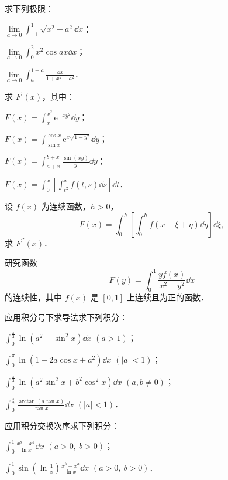 \begin{xiti}
\item 求下列极限：
\begin{ziti}
\item $\lim\limits_{a\to 0}\displaystyle\int_{-1}^{1}\sqrt{x^{2}+a^{2}}\dd x$；
\item $\lim\limits_{a\to 0}\displaystyle\int_{0}^{2}x^{2}\cos ax\dd x$；
\item $\lim\limits_{a\to 0}\displaystyle\int_{a}^{1+a}\frac{\dd x}{1+x^{2}+a^{2}}$．
\end{ziti}
\item 求 $F^{\prime}(x)$，其中：
\begin{ziti}
\item $F(x)=\displaystyle\int_{x}^{x^{2}}\mathrm{e}^{-xy^{2}}\dd y$；
\item $F(x)=\displaystyle\int_{\sin x}^{\cos x}\mathrm{e}^{x\sqrt{1-y^{2}}}\dd y$；
\item $F(x)=\displaystyle\int_{a+x}^{b+x}\frac{\sin(xy)}{y}\dd y$；
\item $F(x)=\displaystyle\int_{0}^{x}\left[\int_{t^{2}}^{x}f(t,s)\dd s\right]\dd t$．
\end{ziti}
\item 设 $f(x)$ 为连续函数，$h>0$，
\[
F(x)=\int_{0}^{h}\left[\int_{0}^{h}f(x+\xi+\eta)\dd\eta\right]\dd\xi,
\]
求 $F^{\prime\prime}(x)$．
\item 研究函数
\[
F(y)=\int_{0}^{1}\frac{yf(x)}{x^{2}+y^{2}}\dd x
\]
的连续性，其中 $f(x)$ 是 $[0,1]$ 上连续且为正的函数．
\item 应用积分号下求导法求下列积分：
\begin{ziti}
\item $\displaystyle\int_{0}^{\frac{\pi}{2}}\ln(a^{2}-\sin^{2}x)\dd x$ $(a>1)$；
\item $\displaystyle\int_{0}^{\pi}\ln(1-2a\cos x+a^{2})\dd x$ $(|a|<1)$；
\item $\displaystyle\int_{0}^{\frac{\pi}{2}}\ln(a^{2}\sin^{2}x+b^{2}\cos^{2}x)\dd x$ $(a,b\neq 0)$；
\item $\displaystyle\int_{0}^{\frac{\pi}{2}}\frac{\arctan(a\tan x)}{\tan x}\dd x$ $(|a|<1)$．
\end{ziti}
\item 应用积分交换次序求下列积分：
\begin{ziti}
\item $\displaystyle\int_{0}^{1}\frac{x^{b}-x^{a}}{\ln x}\dd x$ $(a>0,\ b>0)$；
\item $\displaystyle\int_{0}^{1}\sin\left(\ln\frac{1}{x}\right)\frac{x^{b}-x^{a}}{\ln x}\dd x$ $(a>0,\ b>0)$．

\end{ziti}
\end{xiti}
